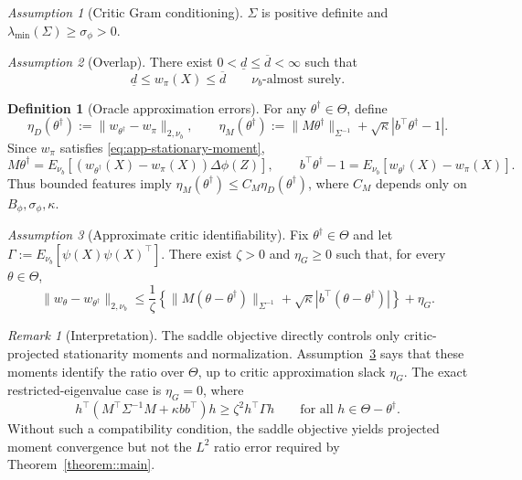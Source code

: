 \documentclass{article}
\theoremstyle{plain}
\theoremstyle{definition}
\newtheorem{definition}{Definition}
\theoremstyle{remark}
\newtheorem{remark}{Remark}
\newtheorem{assumption}{Assumption}
\begin{document}
\begin{assumption}[Critic Gram conditioning]
\label{ass:app-gram}
\(\Sigma\) is positive definite and
\(\lambda_{\min}(\Sigma)\ge\sigma_\phi>0\).
\end{assumption}

\begin{assumption}[Overlap]
\label{ass:app-overlap}
There exist \(0<\underline d\le\overline d<\infty\) such that
\[
\underline d\le w_\pi(X)\le\overline d
\qquad \nu_b\text{-almost surely}.
\]
\end{assumption}

\begin{definition}[Oracle approximation errors]
\label{def:app-oracle-errors}
For any \(\theta^\dagger\in\Theta\), define
\[
\eta_D(\theta^\dagger)
:=
\|w_{\theta^\dagger}-w_\pi\|_{2,\nu_b},
\qquad
\eta_M(\theta^\dagger)
:=
\|M\theta^\dagger\|_{\Sigma^{-1}}
+\sqrt{\kappa}|b^\top\theta^\dagger-1|.
\]
Since \(w_\pi\) satisfies \eqref{eq:app-stationary-moment},
\[
M\theta^\dagger
=
E_{\nu_b}[(w_{\theta^\dagger}(X)-w_\pi(X))\Delta\phi(Z)],
\qquad
b^\top\theta^\dagger-1
=
E_{\nu_b}[w_{\theta^\dagger}(X)-w_\pi(X)].
\]
Thus bounded features imply
\(\eta_M(\theta^\dagger)\le C_M\eta_D(\theta^\dagger)\), where
\(C_M\) depends only on \(B_\phi,\sigma_\phi,\kappa\).
\end{definition}

\begin{assumption}[Approximate critic identifiability]
\label{ass:app-identifiability}
Fix \(\theta^\dagger\in\Theta\) and let
\(\Gamma:=E_{\nu_b}[\psi(X)\psi(X)^\top]\). There exist
\(\zeta>0\) and \(\eta_G\ge0\) such that, for every \(\theta\in\Theta\),
\[
\|w_\theta-w_{\theta^\dagger}\|_{2,\nu_b}
\le
\frac{1}{\zeta}
\left\{
\|M(\theta-\theta^\dagger)\|_{\Sigma^{-1}}
+\sqrt{\kappa}|b^\top(\theta-\theta^\dagger)|
\right\}
+\eta_G .
\]
\end{assumption}

\begin{remark}[Interpretation]
The saddle objective directly controls only critic-projected stationarity
moments and normalization. Assumption~\ref{ass:app-identifiability} says that
these moments identify the ratio over \(\Theta\), up to critic approximation
slack \(\eta_G\). The exact restricted-eigenvalue case is \(\eta_G=0\), where
\[
h^\top(M^\top\Sigma^{-1}M+\kappa bb^\top)h
\ge
\zeta^2 h^\top\Gamma h
\qquad\text{for all }h\in\Theta-\theta^\dagger.
\]
Without such a compatibility condition, the saddle objective yields projected
moment convergence but not the \(L^2\) ratio error required by
Theorem~\ref{theorem::main}.
\end{remark}
\end{document}
